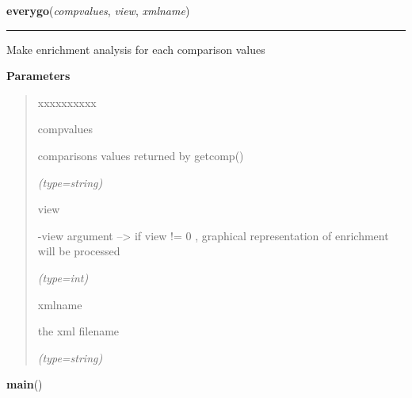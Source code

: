 \hspace{.8\funcindent}\begin{boxedminipage}{\funcwidth}

    \raggedright \textbf{everygo}(\textit{compvalues}, \textit{view}, \textit{xmlname})

    \vspace{-1.5ex}

    \rule{\textwidth}{0.5\fboxrule}
\setlength{\parskip}{2ex}
    Make enrichment analysis for each comparison values

\setlength{\parskip}{1ex}
      \textbf{Parameters}
      \vspace{-1ex}

      \begin{quote}
        \begin{Ventry}{xxxxxxxxxx}

          \item[compvalues]

          comparisons values returned by getcomp()

            {\it (type=string)}

          \item[view]

          -view argument --{\textgreater} if view != 0 , graphical 
          representation of enrichment will be processed

            {\it (type=int)}

          \item[xmlname]

          the xml filename

            {\it (type=string)}

        \end{Ventry}

      \end{quote}

    \end{boxedminipage}

    \label{EveryGO:main}

    \vspace{0.5ex}

\hspace{.8\funcindent}\begin{boxedminipage}{\funcwidth}

    \raggedright \textbf{main}()

\setlength{\parskip}{2ex}
\setlength{\parskip}{1ex}
    \end{boxedminipage}


